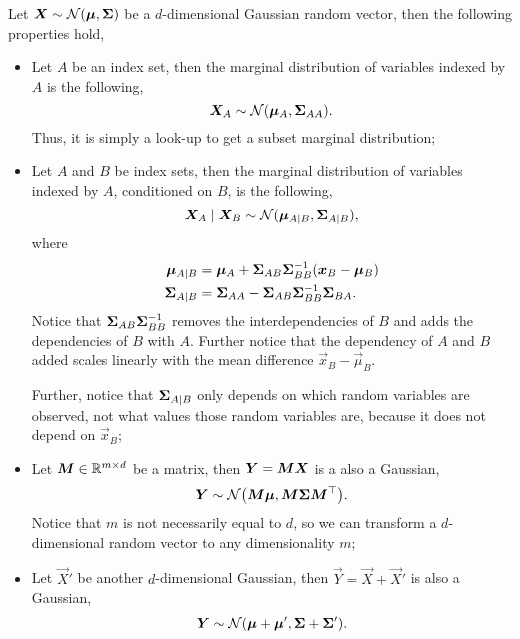 
Let $\bm{X} \sim \mathcal{N}(\bm{\mu},\bm{\Sigma})$ be a $d$-dimensional
Gaussian random vector, then the following properties hold,
\begin{itemize}
  \item Let $A$ be an index set, then the marginal distribution of variables
    indexed by $A$ is the following, \[
      \bm{X}_A \sim \mathcal{N}(\bm{\mu}_A,\bm{\Sigma}_{AA})
    .\]
    Thus, it is simply a look-up to get a subset marginal distribution;

  \item Let $A$ and $B$ be index sets, then the marginal distribution of
    variables indexed by $A$, conditioned on $B$, is the following, \[
      \bm{X}_A\mid \bm{X}_B \sim \mathcal{N}(\bm{\mu}_{A\mid
      B},\bm{\Sigma}_{A\mid B})
    ,\]
    where
    \begin{align*}
      \bm{\mu}_{A\mid B} &= \bm{\mu}_A + \bm{\Sigma}_{AB}\bm{\Sigma}_{BB}^{-1} (\bm{x}_B - \bm{\mu}_B) \\
      \bm{\Sigma}_{A\mid B} &= \bm{\Sigma}_{AA} - \bm{\Sigma}_{AB}\bm{\Sigma}_{BB}^{-1}\bm{\Sigma}_{BA}
    .\end{align*}
    Notice that $\bm{\Sigma}_{AB}\bm{\Sigma}_{BB}^{-1}$ removes the interdependencies
    of $B$ and adds the dependencies of $B$ with $A$. Further notice that the
    dependency of $A$ and $B$ added scales linearly with the mean difference
    $\vec{x}_B - \vec{\mu}_B$.

    Further, notice that $\bm{\Sigma}_{A\mid B}$ only depends on which random
    variables are observed, not what values those random variables are, because
    it does not depend on $\vec{x}_B$;

  \item Let $\bm{M}\in\mathbb{R}^{m\times d}$ be a matrix, then $\bm{Y} =
    \bm{M}\bm{X}$ is a also a Gaussian, \[
      \vec{Y} \sim \mathcal{N}\lft( \mat{M}\vec{\mu}, \mat{M}\mat{\Sigma}\transpose{\mat{M}} \rgt)
    .\]
    Notice that $m$ is not necessarily equal to $d$, so we can transform a
    $d$-dimensional random vector to any dimensionality $m$;

  \item Let $\vec{X}'$ be another $d$-dimensional Gaussian, then
    $\vec{Y}=\vec{X}+\vec{X}'$ is also a Gaussian, \[
      \vec{Y} \sim \mathcal{N} \lft( \vec{\mu} + \vec{\mu}', \mat{\Sigma} + \mat{\Sigma}' \rgt)
    .\]
\end{itemize}

